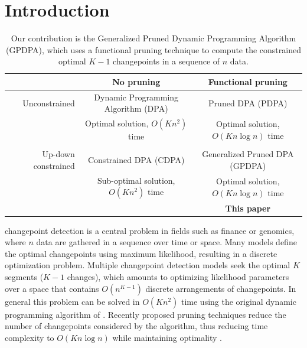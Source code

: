 \documentclass{article}
\begin{document}
\section{Introduction}

\begin{table}
  \centering
  \begin{tabular}{r|c|c}
    & No pruning & Functional pruning \\
    \hline
    Unconstrained & Dynamic Programming Algorithm (DPA) & Pruned DPA (PDPA) \\
    & Optimal solution, $O(Kn^2)$ time & Optimal solution, $O(Kn\log n)$ time\\
    & \citet{segment-neighborhood, optimal-partitioning}     & \citet{pruned-dp, johnson} \\
    \hline
    Up-down constrained & Constrained DPA (CDPA) & Generalized Pruned DPA (GPDPA) \\
    & Sub-optimal solution, $O(Kn^2)$ time & Optimal solution, $O(Kn\log n)$ time\\
    & \citet{HOCKING-PeakSeg} & \textbf{This paper} \\
    \hline
  \end{tabular}
  \caption{Our contribution is 
the Generalized Pruned Dynamic Programming Algorithm (GPDPA), 
 which uses a functional pruning technique 
    to compute the constrained optimal $K-1$ changepoints 
in a sequence of $n$ data.}
\label{tab:contribution}
\end{table}

changepoint detection is a central problem in fields such as finance
or genomics, where $n$ data are gathered in a sequence over time or
space. Many models define the optimal changepoints using maximum
likelihood, resulting in a discrete optimization problem. Multiple
changepoint detection models seek the optimal $K$ segments
($K-1$ changes), which amounts to optimizing likelihood
parameters over a space that contains $O(n^{K-1})$ discrete
arrangements of changepoints. In general this problem can be solved
in $O(Kn^2)$ time using the original dynamic programming algorithm of
\citet{segment-neighborhood}. Recently proposed pruning techniques
reduce the number of changepoints considered by the algorithm, thus
reducing time complexity to $O(K n\log n)$ while maintaining
optimality \citep{pruned-dp, pelt, johnson, fpop}.
\end{document}
